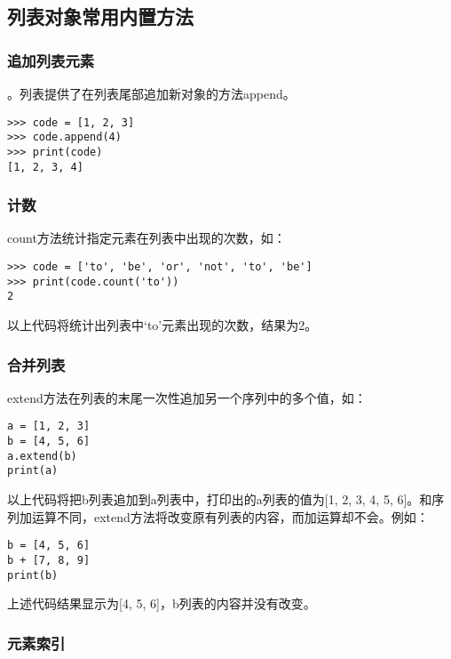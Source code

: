 \subsection{列表对象常用内置方法}

\subsubsection{追加列表元素}
。列表提供了在列表尾部追加新对象的方法append。

\begin{lstlisting}
>>> code = [1, 2, 3]
>>> code.append(4)
>>> print(code)
[1, 2, 3, 4]
\end{lstlisting}

\subsubsection{计数}

count方法统计指定元素在列表中出现的次数，如：

\begin{lstlisting}
>>> code = ['to', 'be', 'or', 'not', 'to', 'be']
>>> print(code.count('to'))
2
\end{lstlisting}

以上代码将统计出列表中‘to’元素出现的次数，结果为2。

\subsubsection{合并列表}

extend方法在列表的末尾一次性追加另一个序列中的多个值，如：

\begin{lstlisting}
a = [1, 2, 3]
b = [4, 5, 6]
a.extend(b)
print(a)
\end{lstlisting}

以上代码将把b列表追加到a列表中，打印出的a列表的值为[1, 2, 3, 4, 5, 6]。和序列加运算不同，extend方法将改变原有列表的内容，而加运算却不会。例如：

\begin{lstlisting}
b = [4, 5, 6]
b + [7, 8, 9]
print(b)
\end{lstlisting}

上述代码结果显示为[4, 5, 6]，b列表的内容并没有改变。

\subsubsection{元素索引}

